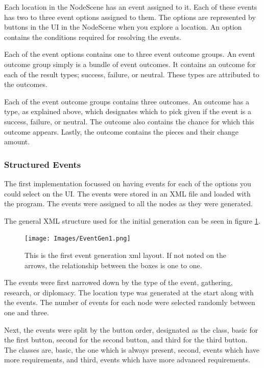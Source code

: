 Each location in the NodeScene has an event assigned to it. 
Each of these events has two to three event options assigned to them. The options are represented by buttons in the UI in the NodeScene when you explore a location. An option contains the conditions required for resolving the events. 

Each of the event options contains one to three event outcome groups. An event outcome group simply is a bundle of event outcomes. It contains an outcome for each of the result types; success, failure, or neutral. These types are attributed to the outcomes.

Each of the event outcome groups contains three outcomes. An outcome has a type, as explained above, which designates which to pick given if the event is a success, failure, or neutral. The outcome also contains the chance for which this outcome appears. Lastly, the outcome contains the pieces and their change amount. 

\subsubsection{Structured Events}
The first implementation focussed on having events for each of the options you could select on the UI. The events were stored in an XML file and loaded with the program. The events were assigned to all the nodes as they were generated.

The general XML structure used for the initial generation can be seen in figure \ref{fig:eGen1}.

\begin{figure}[!ht]
    \centering
    \texttt{[image: Images/EventGen1.png]}
    \caption{This is the first event generation xml layout. If not noted on the arrows, the relationship between the boxes is one to one.}
    \label{fig:eGen1}
\end{figure}

The events were first narrowed down by the type of the event, gathering, research, or diplomacy. The location type was generated at the start along with the events. The number of events for each node were selected randomly between one and three.

Next, the events were split by the button order, designated as the class, basic for the first button, second for the second button, and third for the third button. 
The classes are, basic, the one which is always present, second, events which have more requirements, and third, events which have more advanced requirements. 

